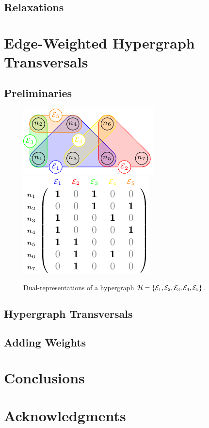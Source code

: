 \documentclass[aps, 10pt, english, twoside, twocolumn, pra, nofootinbib, tightenlines, longbibliography, superscriptaddress]{revtex4-1}
\begin{document}
    \subsection{Relaxations}

    \section{Edge-Weighted Hypergraph Transversals}
    \subsection{Preliminaries}
    \begin{center}
        \begin{figure}
            \includegraphics[width=\linewidth]{figures/hypergraph_diagram_1_standalone/figure.pdf}
            \includegraphics[width=0.8\linewidth]{figures/hypergraph_matrix_1_standalone/figure.pdf}
            \caption{Dual-representations of a hypergraph $\hypergraph = \bc{\edges_1,\edges_2,\edges_3,\edges_4,\edges_5}$.}
        \end{figure}
    \end{center}
    \subsection{Hypergraph Transversals}
    \subsection{Adding Weights}

    \section{Conclusions}
    \section*{Acknowledgments}

    \setlength{\bibsep}{3pt plus 3pt minus 2pt}
    
    \nocite{apsrev41Control}
    
\end{document}
